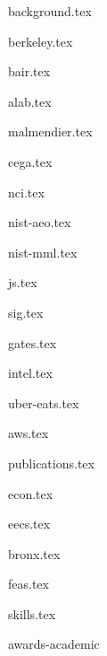 \documentclass[11pt]{article}
\begin{document}
{background.tex}


{berkeley.tex}


{bair.tex}

{alab.tex}

{malmendier.tex}

{cega.tex}

{nci.tex}

{nist-aeo.tex}

{nist-mml.tex}



{js.tex}

{sig.tex}

{gates.tex}

{intel.tex}

{uber-eats.tex}

{aws.tex}


{publications.tex}


{econ.tex}

{eecs.tex}

{bronx.tex}

{feas.tex}

{skills.tex}


{awards-academic}
\end{document}
